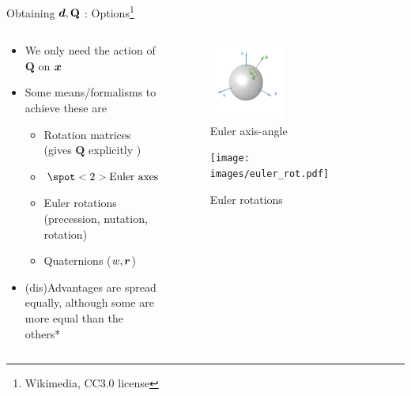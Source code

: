 \documentclass[presentation]{beamer}
\newcommand{\gv}[1]{\ensuremath{\mbox{\boldmath$ #1 $}}}
\newcommand{\bv}[1]{\ensuremath{\mathbf{#1}}}
\begin{document}
\begin{frame}[label={sec:org8fac1e7}]{Obtaining \(\gv{d}, \bv{Q}\) : Options\footnote{Wikimedia, CC3.0 license}}
\begin{columns}
\begin{column}{0.6\columnwidth}
\begin{itemize}
\item We only need the \alert{action} of \(\bv{Q}\) on \(\gv{x}\)
\item Some means/formalisms to achieve these are
\begin{itemize}
\item Rotation matrices (gives \(\bv{Q}\) explicitly )
\item \(\spot<2>{\text{Euler axes and angle } \gv{r} = \theta \hat{\gv{e}} }\)
\item Euler rotations (precession, nutation, rotation)
\item Quaternions (\(w, \gv{r}\))
\end{itemize}
\item (dis)Advantages are spread equally, although some are more equal than the others*
\end{itemize}
\end{column}
\begin{column}{0.4\columnwidth}
\begin{figure}[htbp]
\centering
\includegraphics[width=0.45\textwidth]{images/euler_aa.png}
\caption{Euler axis-angle}
\end{figure}
\begin{figure}[htbp]
\centering
\texttt{[image: images/euler\_rot.pdf]}
\caption{Euler rotations}
\end{figure}
\end{column}
\end{columns}
\end{frame}
\end{document}
